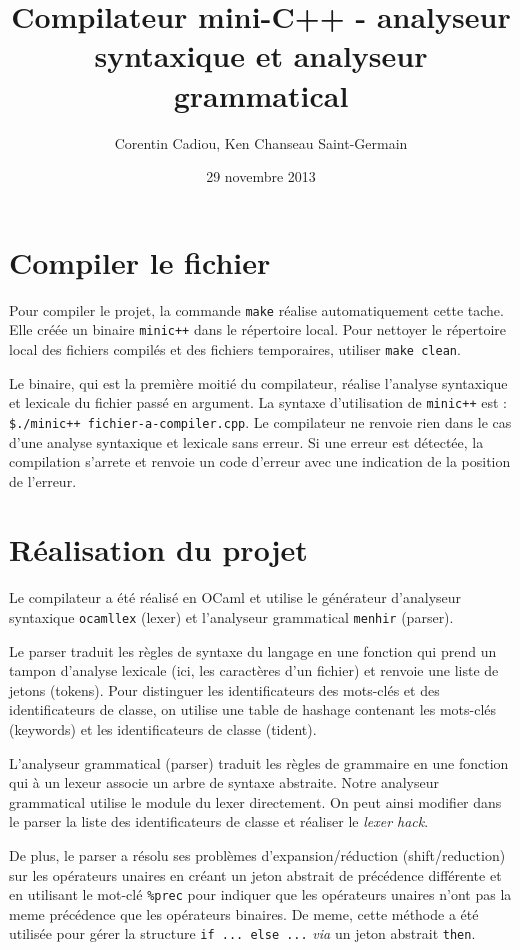 \documentclass{article}
\title{Compilateur mini-C++ - analyseur syntaxique et analyseur grammatical}
\author{Corentin Cadiou, Ken Chanseau Saint-Germain}
\date{29 novembre 2013}
\begin{document}
\maketitle
\section*{Compiler le fichier}
Pour compiler le projet, la commande \texttt{make} réalise
automatiquement cette tache. Elle créée un binaire \texttt{minic++}
dans le répertoire local. Pour nettoyer le répertoire local des
fichiers compilés et des fichiers temporaires, utiliser \texttt{make clean}.

Le binaire, qui est la première moitié du compilateur, réalise
l'analyse syntaxique et lexicale du fichier passé en argument. La
syntaxe d'utilisation de \texttt{minic++} est : \texttt{\$./minic++
  fichier-a-compiler.cpp}. Le compilateur ne renvoie rien dans le cas
d'une analyse syntaxique et lexicale sans erreur. Si une erreur est
détectée, la compilation s'arrete et renvoie un code d'erreur avec une
indication de la position de l'erreur.

\section*{Réalisation du projet}
Le compilateur a été réalisé en OCaml et utilise le générateur
d'analyseur syntaxique \texttt{ocamllex} (lexer) et l'analyseur grammatical
\texttt{menhir} (parser).

Le parser traduit les règles de syntaxe du langage en une fonction
qui prend un tampon d'analyse lexicale (ici, les caractères d'un
fichier) et renvoie une liste de jetons (tokens). Pour distinguer les
identificateurs des mots-clés et des identificateurs de classe, on
utilise une table de hashage contenant les mots-clés (keywords) et les
identificateurs de classe (tident).

L'analyseur grammatical (parser) traduit les règles de grammaire en
une fonction qui à un lexeur associe un arbre de syntaxe
abstraite. Notre analyseur grammatical utilise le module du lexer
directement. On peut ainsi modifier dans le parser la liste
des identificateurs de classe et réaliser le \emph{lexer hack}.

De plus, le parser a résolu ses problèmes d'expansion/réduction
(shift/reduction) sur les opérateurs unaires en créant un jeton
abstrait de précédence différente et en utilisant le mot-clé
\texttt{\%prec} pour indiquer que les opérateurs unaires n'ont pas la
meme précédence que les opérateurs binaires. De meme, cette méthode a
été utilisée pour gérer la structure \texttt{if ... else ...}
\emph{via} un jeton abstrait \texttt{then}.
\pagebreak
\end{document}
